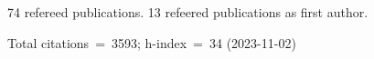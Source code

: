 74 refereed publications. 13 refeered publications as first author.

Total citations~=~3593; h-index~=~34 (2023-11-02)